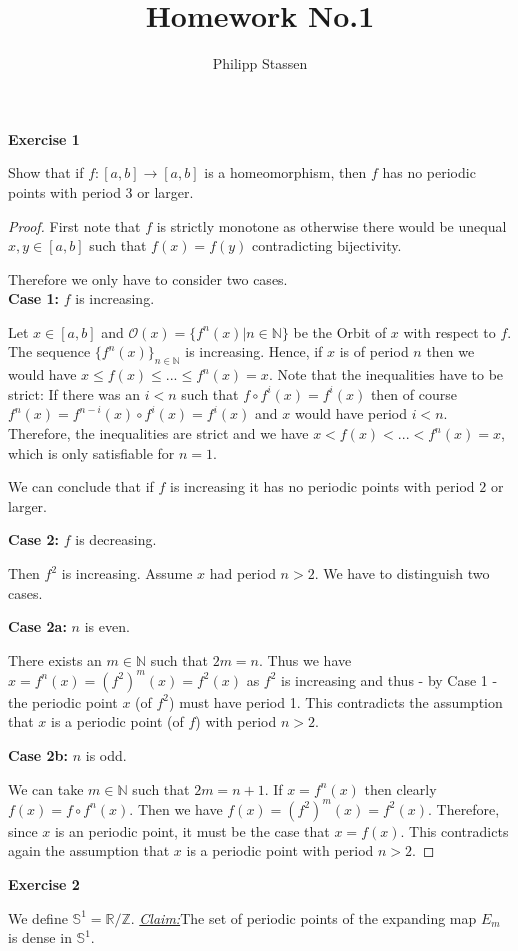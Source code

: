 \documentclass{article}
\title{Homework No.1}
\author{Philipp Stassen}
\newcommand{\claim}{\underline{\textit{Claim:}}\hspace{0,2cm}}
\newcommand{\N}{\mathbb{N}}
\newcommand{\Z}{\mathbb{Z}}
\renewcommand{\S}[1]{\mathbb{S}^{#1}}
\renewcommand{\O}{\mathcal{O}}
\theoremstyle{definition}
\theoremstyle{plain}
\theoremstyle{remark}
\newcommand{\aufgabe}[1]{
	{
		\vspace*{0.5cm}
		\textsf{\textbf{Exercise #1}}
		\vspace*{0.2cm}

	}
}
\begin{document}
\maketitle
\aufgabe1
Show that if $f:[a,b]\rightarrow[a,b]$ is a homeomorphism, then $f$ has no periodic points with period $3$ or larger.
\begin{proof}
	First note that $f$ is strictly monotone as otherwise there would be unequal $x,y\in [a,b]$ such that $f(x)=f(y)$ contradicting bijectivity.

	Therefore we only have to consider two cases. \\
\textbf{Case 1:} $f$ is increasing.

Let $x \in [a,b]$ and $\O(x)=\{f^n(x)|n\in\N\}$ be the Orbit of $x$ with respect to $f$. 
The sequence $\{f^n(x)\}_{n\in\N}$ is increasing. Hence, if $x$ is of period $n$ then we would have $x \leq f(x) \leq ... \leq f^n(x) = x$. Note that the inequalities have to be strict: If there was an $i<n$ such that $f\circ f^i(x) = f^i(x)$ then of course $f^n(x) = f^{n-i}(x)\circ f^i(x)= f^i(x)$ and $x$ would have period $i < n$.
Therefore, the inequalities are strict and we have $x < f(x) < ... < f^n(x) = x$, which is only satisfiable for $n=1$. 

We can conclude that if $f$ is increasing it has no periodic points with period $2$ or larger.


\textbf{Case 2:} $f$ is decreasing.

Then $f^2$ is increasing. Assume $x$ had period $n > 2$. We have to distinguish two cases. 

\textbf{Case 2a:} $n$ is even.

There exists an $m\in\N$ such that $2m = n$. Thus we have $x = f^n(x) = (f^2)^m(x) = f^2 (x)$ as $f^2$ is increasing and thus - by Case 1 - the periodic point $x$ (of $f^2$) must have period 1. This contradicts the assumption that $x$ is a periodic point (of $f$) with period $n > 2$.

\textbf{Case 2b:} $n$ is odd.

We can take $m\in \N$ such that $2m = n+1$. If $x = f^n(x)$ then clearly $f(x) = f\circ f^n (x)$. Then we have $f(x) = (f^2)^m (x) = f^2(x)$. Therefore, since $x$ is an periodic point, it must be the case that $x = f(x)$. This contradicts again the assumption that $x$ is a periodic point with period $n > 2$.
\end{proof}
\aufgabe2 
We define $\S1 = \mathbb{R}/\Z$.
\claim The set of periodic points of the expanding map $E_m$ is dense in $\S1$.
\end{document}
